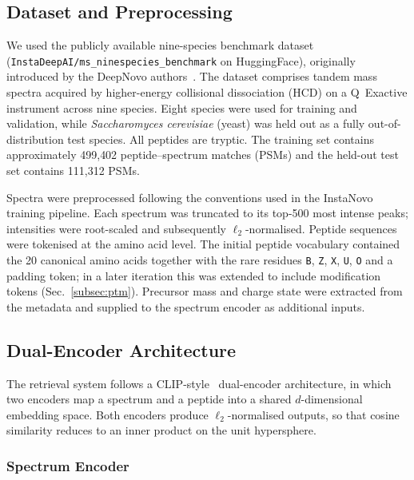 \documentclass[pdflatex,sn-mathphys-num]{sn-jnl}%
\theoremstyle{thmstyleone}%
\theoremstyle{thmstyletwo}%
\theoremstyle{thmstylethree}%
\begin{document}
\subsection{Dataset and Preprocessing}
\label{subsec:dataset}

We used the publicly available nine-species benchmark dataset (\texttt{InstaDeepAI/ms\_ninespecies\_benchmark} on HuggingFace), originally introduced by the DeepNovo authors~\cite{tran2017denovo}. The dataset comprises tandem mass spectra acquired by higher-energy collisional dissociation (HCD) on a Q~Exactive instrument across nine species. Eight species were used for training and validation, while \emph{Saccharomyces cerevisiae} (yeast) was held out as a fully out-of-distribution test species. All peptides are tryptic. The training set contains approximately 499{,}402 peptide--spectrum matches (PSMs) and the held-out test set contains 111{,}312 PSMs.

Spectra were preprocessed following the conventions used in the InstaNovo training pipeline. Each spectrum was truncated to its top-500 most intense peaks; intensities were root-scaled and subsequently $\ell_2$-normalised. Peptide sequences were tokenised at the amino acid level. The initial peptide vocabulary contained the 20 canonical amino acids together with the rare residues \texttt{B}, \texttt{Z}, \texttt{X}, \texttt{U}, \texttt{O} and a padding token; in a later iteration this was extended to include modification tokens (Sec.~\ref{subsec:ptm}). Precursor mass and charge state were extracted from the metadata and supplied to the spectrum encoder as additional inputs.

\subsection{Dual-Encoder Architecture}
\label{subsec:architecture}

The retrieval system follows a CLIP-style~\cite{radford2021clip} dual-encoder architecture, in which two encoders map a spectrum and a peptide into a shared $d$-dimensional embedding space. Both encoders produce $\ell_2$-normalised outputs, so that cosine similarity reduces to an inner product on the unit hypersphere.

\subsubsection{Spectrum Encoder}
\end{document}
